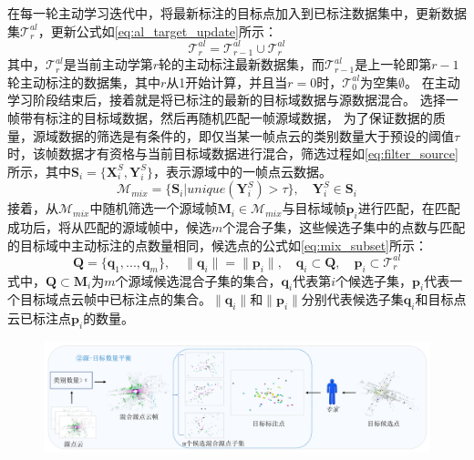     在每一轮主动学习迭代中，将最新标注的目标点加入到已标注数据集中，更新数据集$\mathcal{T}^{al}_r$，更新公式如\eqref{eq:al_target_update}所示：
    \begin{equation}
        \label{eq:al_target_update}
        \mathcal{T}^{al}_r = \mathcal{T}^{al}_{r-1} \cup \mathcal{T}^{al}_r 
    \end{equation}
    其中，$\mathcal{T}^{al}_r$是当前主动学第$r$轮的主动标注最新数据集，而$\mathcal{T}^{al}_{r-1}$是上一轮即第$r-1$轮主动标注的数据集，其中$r$从1开始计算，并且当$r=0$时，$\mathcal{T}^{al}_0$为空集$\emptyset$。
    在主动学习阶段结束后，接着就是将已标注的最新的目标域数据与源数据混合。
    选择一帧带有标注的目标域数据，然后再随机匹配一帧源域数据，
    为了保证数据的质量，源域数据的筛选是有条件的，即仅当某一帧点云的类别数量大于预设的阈值$\tau$时，该帧数据才有资格与当前目标域数据进行混合，筛选过程如\eqref{eq:filter_source}所示，其中$\mathbf{S}_i = \{\mathbf{X}^S_i,\mathbf{Y}^S_i\}$，表示源域中的一帧点云数据。
    \begin{equation}
        \label{eq:filter_source}
        \mathcal{M}_{mix}= \{\mathbf{S}_i | unique(\mathbf{Y}^S_i)> \tau\}, \quad \mathbf{Y}^S_i \in \mathbf{S}_i
    \end{equation}
    接着，从$\mathcal{M}_{mix}$中随机筛选一个源域帧$\mathbf{M}_i \in \mathcal{M}_{mix}$与目标域帧$\mathbf{p}_i$进行匹配，在匹配成功后，将从匹配的源域帧中，候选$m$个混合子集，这些候选子集中的点数与匹配的目标域中主动标注的点数量相同，候选点的公式如\eqref{eq:mix_subset}所示：
    \begin{equation}
        \label{eq:mix_subset}
        \mathbf{Q} = \{\mathbf{q}_1,...,\mathbf{q}_m\}, 
        \quad
        \|\mathbf{q}_i\| = \|\mathbf{p}_i\|,
        \quad
        \mathbf{q}_i \subset \mathbf{Q},
        \quad
        \mathbf{p}_i \subset \mathcal{T}^{al}_r
    \end{equation}
    式中，$\mathbf{Q} \subset \mathbf{M}_i$为$m$个源域候选混合子集的集合，$\mathbf{q}_i$代表第$i$个候选子集，$\mathbf{p}_i$代表一个目标域点云帧中已标注点的集合。$\|\mathbf{q}_i\|$和$\|\mathbf{p}_i\|$分别代表候选子集$\mathbf{q}_i$和目标点云已标注点$\mathbf{p}_i$的数量。
    \vspace{-0.1cm}
    \begin{figure}[h]
        \centering
        \includegraphics[width = \textwidth, scale=0.5]{ljx/figure/4-2s-t.pdf}
        \label{fig:4-2}
    \end{figure}
    \vspace{-0.35cm}
